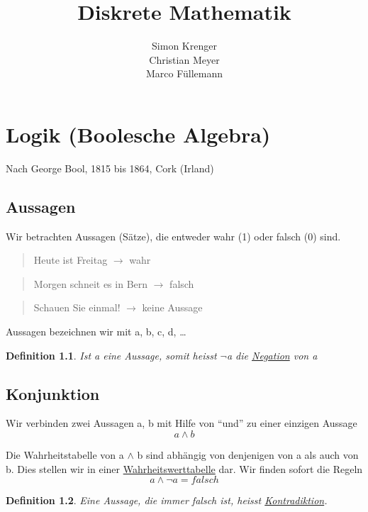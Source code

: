 \documentclass{report}
\title{Diskrete Mathematik}
\author{Simon Krenger\\Christian Meyer\\Marco Füllemann}
\newtheorem{mydef}{Definition}
\begin{document}
\maketitle
\chapter{Logik (Boolesche Algebra)}
Nach George Bool, 1815 bis 1864, Cork (Irland)
\section{Aussagen}
Wir betrachten Aussagen (Sätze), die entweder wahr (1) oder falsch (0) sind.

\begin{quote}Heute ist Freitag \(\to\) wahr\end{quote}
\begin{quote}Morgen schneit es in Bern \(\to\) falsch\end{quote}
\begin{quote}Schauen Sie einmal! \(\to\) keine Aussage\end{quote}
Aussagen bezeichnen wir mit a, b, c, d, …
\begin{mydef}
Ist a eine Aussage, somit heisst  \(\lnot\)a die \underline{Negation} von a
\end{mydef}

\section{Konjunktion}
Wir verbinden zwei Aussagen a, b mit Hilfe von “und” zu einer einzigen Aussage
\begin{equation}a \land b\end{equation}

Die Wahrheitstabelle von a \(\land\) b sind abhängig von denjenigen von a als auch von b. Dies stellen wir in einer \underline{Wahrheitswerttabelle} dar. Wir finden sofort die Regeln
\begin{equation}a \land \lnot a = falsch\end{equation}


\begin{mydef}Eine Aussage, die immer falsch ist, heisst \underline{Kontradiktion}.\end{mydef}
\end{document}
